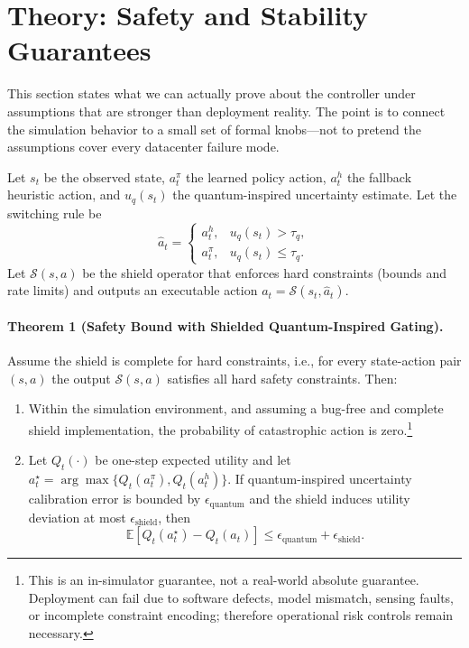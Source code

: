 \section{Theory: Safety and Stability Guarantees}

This section states what we can actually prove about the controller under assumptions that are stronger than deployment reality. The point is to connect the simulation behavior to a small set of formal knobs---not to pretend the assumptions cover every datacenter failure mode.

Let $s_t$ be the observed state, $a_t^{\pi}$ the learned policy action, $a_t^{h}$ the fallback heuristic action, and $u_q(s_t)$ the quantum-inspired uncertainty estimate. Let the switching rule be
\[
\hat a_t=
\begin{cases}
a_t^{h}, & u_q(s_t)>\tau_q,\\
a_t^{\pi}, & u_q(s_t)\le\tau_q.
\end{cases}
\]
Let $\mathcal{S}(s,a)$ be the shield operator that enforces hard constraints (bounds and rate limits) and outputs an executable action $a_t=\mathcal{S}(s_t,\hat a_t)$.

\paragraph{Theorem 1 (Safety Bound with Shielded Quantum-Inspired Gating).}
Assume the shield is complete for hard constraints, i.e., for every state-action pair $(s,a)$ the output $\mathcal{S}(s,a)$ satisfies all hard safety constraints. Then:
\begin{enumerate}
	\item Within the simulation environment, and assuming a bug-free and complete shield implementation, the probability of catastrophic action is zero.\footnote{This is an in-simulator guarantee, not a real-world absolute guarantee. Deployment can fail due to software defects, model mismatch, sensing faults, or incomplete constraint encoding; therefore operational risk controls remain necessary.}
	\item Let $Q_t(\cdot)$ be one-step expected utility and let $a_t^{\star}=\arg\max\{Q_t(a_t^{\pi}),Q_t(a_t^h)\}$. If quantum-inspired uncertainty calibration error is bounded by $\epsilon_{\text{quantum}}$ and the shield induces utility deviation at most $\epsilon_{\text{shield}}$, then
	\[
	\mathbb{E}[Q_t(a_t^{\star})-Q_t(a_t)] \le \epsilon_{\text{quantum}}+\epsilon_{\text{shield}}.
	\]
\end{enumerate}

